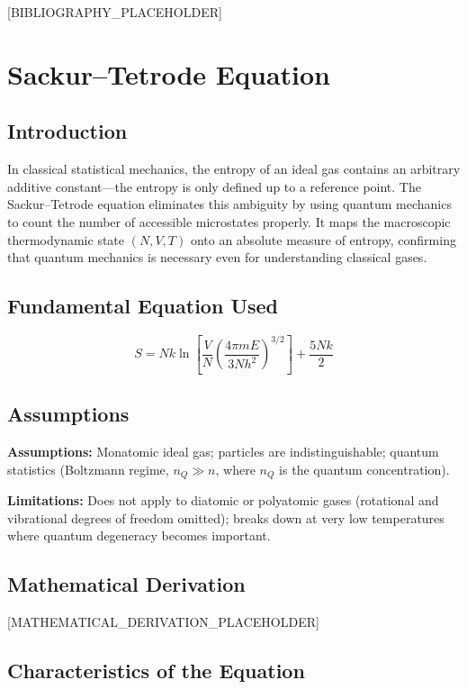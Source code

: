 \documentclass[11pt,openright]{book}
\begin{document}
[BIBLIOGRAPHY_PLACEHOLDER]


\chapter{Sackur--Tetrode Equation}

\section*{Introduction}

In classical statistical mechanics, the entropy of an ideal gas contains an arbitrary additive constant---the entropy is only defined up to a reference point. The Sackur--Tetrode equation eliminates this ambiguity by using quantum mechanics to count the number of accessible microstates properly. It maps the macroscopic thermodynamic state $(N, V, T)$ onto an absolute measure of entropy, confirming that quantum mechanics is necessary even for understanding classical gases.
\section*{Fundamental Equation Used}

\begin{equation}
S = Nk\ln\left[\frac{V}{N}\left(\frac{4\pi m E}{3Nh^2}\right)^{3/2}\right] + \frac{5Nk}{2}
\end{equation}
\section*{Assumptions}

\textbf{Assumptions:} Monatomic ideal gas; particles are indistinguishable; quantum statistics (Boltzmann regime, $n_Q \gg n$, where $n_Q$ is the quantum concentration).


\textbf{Limitations:} Does not apply to diatomic or polyatomic gases (rotational and vibrational degrees of freedom omitted); breaks down at very low temperatures where quantum degeneracy becomes important.


\section*{Mathematical Derivation}

[MATHEMATICAL_DERIVATION_PLACEHOLDER]

\section*{Characteristics of the Equation}
\end{document}
